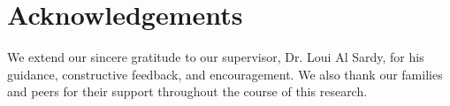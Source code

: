 ﻿\chapter*{Acknowledgements}
We extend our sincere gratitude to our supervisor, Dr. Loui Al Sardy, for his guidance, constructive feedback, and encouragement. We also thank our families and peers for their support throughout the course of this research.
